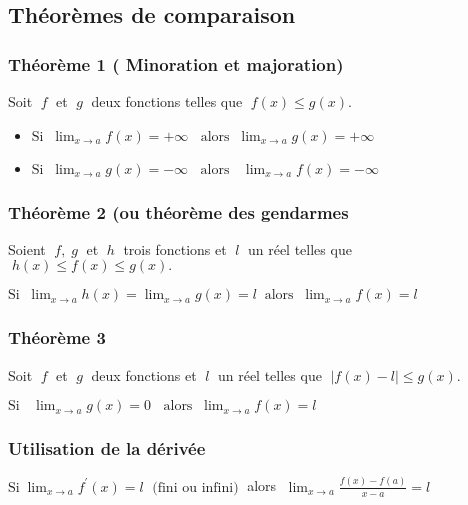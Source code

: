       \subsection{Théorèmes de comparaison}
\subsubsection*{Théorème 1 ( Minoration et  majoration)}
     \begin{theorem}
           Soit $\;f \;$ et $\;g \;$  deux fonctions telles que $\;   f(x)\leq g(x) $.
        \begin{itemize}           
         \item  $  \text{Si}\; \;\displaystyle \lim_{x \to a}{f(x)} =+\infty \;\; \text{ alors} \;\; \displaystyle\lim_{x \to a}{g(x)} =+\infty$
          
          
        \item   $ \text{Si}\;\; \displaystyle \lim_{x \to a}{g(x)} =-\infty \;\; \text{ alors }\;\; \lim_{x \to a}{f(x)} =-\infty$
          \end{itemize}
       \end{theorem}
     
      \subsubsection*{Théorème 2 (ou théorème  des gendarmes}
          \begin{theorem}
            Soient  $\; f  , \; g  \; $  et  $ \; h \;$  trois fonctions et  $\;l \;$ un réel telles que  $ \; h(x)\leq f(x) \leq g(x).$
            
           $ \text{Si}\;  \; \displaystyle\lim_{x \to a}{h(x)} =\displaystyle\lim_{x \to a}{g(x)}=l  \;\; \text{alors} \;\; \lim_{x \to a}{f(x)} =l$ 
       \end{theorem}
     \subsubsection*{Théorème 3}
      \begin{theorem} Soit $\;  f \; $ et $\; g \;$  deux fonctions et $\; l  \; $  un réel telles que $\;\left|f(x)-l\right| \leq g(x).$
      
     $ \text{Si }\; \;\displaystyle\lim_{x \to a}{g(x)} =0 \;\; \text{ alors}\; \;\displaystyle \lim_{x \to a}{f(x)} =l$
     \end{theorem}
      \subsubsection*{Utilisation de la dérivée}
     \begin{theorem}
           $ \text{Si} \;\displaystyle\lim_{x \to a}{f^{\prime}(x)} =l\; \text{ (fini ou infini)}\;$   alors $  \; \displaystyle\lim_{x \to a}{\frac{f(x)-f(a)}{x-a}} =l$
            \end{theorem}

